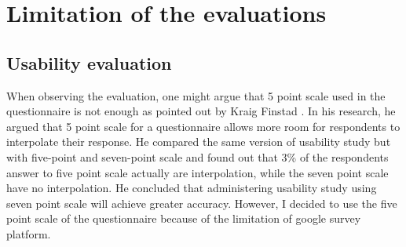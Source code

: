 \section {Limitation of the evaluations}

\subsection{Usability evaluation}

When observing the evaluation, one might argue that 5 point scale used in the questionnaire is not enough as pointed out by Kraig Finstad \cite{finstad2010response}. In his research, he argued that 5 point scale for a questionnaire allows more room for respondents to interpolate their response. He compared the same version of usability study but with five-point and seven-point scale and found out that 3\% of the respondents answer to five point scale actually are interpolation, while the seven point scale have no interpolation. He concluded that administering usability study using seven point scale will achieve greater accuracy. However, I decided to use the five point scale of the questionnaire because of the limitation of google survey platform. 

\noindent%
\begin{minipage}{\linewidth}%
 \label{fig:google-limit}%
\end{minipage}


